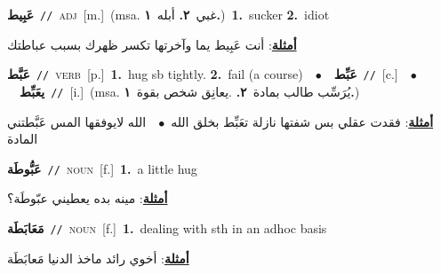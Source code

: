 \documentclass[10pt,a4paper,twoside]{article} %
\begin{document}
\begin{multicols}{2}
{\setlength\topsep{0pt}\textbf{\foreignlanguage{arabic}{عَبِيط}}\ {\color{gray}\texttt{//}\color{black}}\ \textsc{adj}\ [m.]\ \color{gray}(msa. \foreignlanguage{arabic}{غبي}~\foreignlanguage{arabic}{\textbf{٢.}}  \foreignlanguage{arabic}{أبله}~\foreignlanguage{arabic}{\textbf{١.}})\color{black}\ \textbf{1.}~sucker  \textbf{2.}~idiot\  \begin{flushright}\color{gray}\foreignlanguage{arabic}{\textbf{\underline{\foreignlanguage{arabic}{أمثلة}}}: أنت عَبِيط يما وآخرتها تكسر ظهرك بسبب عباطتك}\end{flushright}\color{black}} \vspace{2mm}

{\setlength\topsep{0pt}\textbf{\foreignlanguage{arabic}{عَبَّط}}\ {\color{gray}\texttt{//}\color{black}}\ \textsc{verb}\ [p.]\ \textbf{1.}~hug sb tightly.  \textbf{2.}~fail (a course)\ \ $\bullet$\ \ \setlength\topsep{0pt}\textbf{\foreignlanguage{arabic}{عَبِّط}}\ {\color{gray}\texttt{//}\color{black}}\ [c.]\ \ $\bullet$\ \ \setlength\topsep{0pt}\textbf{\foreignlanguage{arabic}{يعَبِّط}}\ {\color{gray}\texttt{//}\color{black}}\ [i.]\ \color{gray}(msa. \foreignlanguage{arabic}{يُرَسِّب طالب بمادة}~\foreignlanguage{arabic}{\textbf{٢.}}  .\foreignlanguage{arabic}{يعانِق شخص بقوة}~\foreignlanguage{arabic}{\textbf{١.}})\color{black}\  \begin{flushright}\color{gray}\foreignlanguage{arabic}{\textbf{\underline{\foreignlanguage{arabic}{أمثلة}}}: فقدت عقلي بس شفتها نازلة تعَبِّط بخلق الله\ $\bullet$\ \  الله لايوفقها المس عَبَّطتني المادة}\end{flushright}\color{black}} \vspace{2mm}

{\setlength\topsep{0pt}\textbf{\foreignlanguage{arabic}{عَبُّوطَة}}\ {\color{gray}\texttt{//}\color{black}}\ \textsc{noun}\ [f.]\ \textbf{1.}~a little hug\  \begin{flushright}\color{gray}\foreignlanguage{arabic}{\textbf{\underline{\foreignlanguage{arabic}{أمثلة}}}: مينه بده يعطيني عبّوطَة؟}\end{flushright}\color{black}} \vspace{2mm}

{\setlength\topsep{0pt}\textbf{\foreignlanguage{arabic}{مَعَابَطَة}}\ {\color{gray}\texttt{//}\color{black}}\ \textsc{noun}\ [f.]\ \textbf{1.}~dealing with sth in an adhoc basis\  \begin{flushright}\color{gray}\foreignlanguage{arabic}{\textbf{\underline{\foreignlanguage{arabic}{أمثلة}}}: أخوي رائد ماخذ الدنيا مَعابَطَة}\end{flushright}\color{black}} \vspace{2mm}


\end{multicols}
\end{document}
